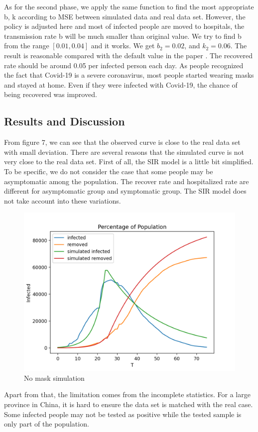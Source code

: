 \documentclass{article}
\begin{document}
As for the second phase, we apply the same function to find the most appropriate b, k according to MSE between simulated data and real data set. However, the policy is adjusted here and most of infected people are moved to hospitals, the transmission rate b will be much smaller than original value. We try to find b from the range $[0.01, 0.04]$ and it works. We get $b_{2}= 0.02$, and $k_{2} = 0.06$. The result is reasonable compared with the default value in the paper \cite{Cooper2020SIR}. The recovered rate should be around 0.05 per infected person each day. As people recognized the fact that Covid-19 is a severe coronavirus, most people started wearing masks and stayed at home. Even if they were infected with Covid-19, the chance of being recovered was improved. 





\subsection{Results and Discussion}

From figure 7, we can see that the observed curve is close to the real data set with small deviation. There are several reasons that the simulated curve is not very close to the real data set. First of all, the SIR model is a little bit simplified. To be specific, we do not consider the case that some people may be asymptomatic among the population. The recover rate and hospitalized rate are different for asymptomatic group and symptomatic group. The SIR model does not take account into these variations. 


\begin{figure}[htp]
\centering
\includegraphics[width=.3\textwidth]{covidsir.png}
\caption{No mask simulation}
\label{fig:figure6}
\end{figure}



Apart from that, the limitation comes from the incomplete statistics. For a large province in China, it is hard to ensure the data set is matched with the real case. Some infected people may not be tested as positive while the tested sample is only part of the population.
\end{document}

